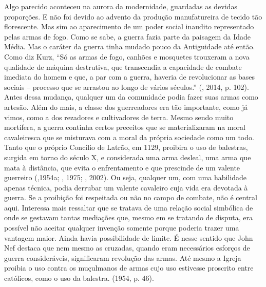 Algo parecido aconteceu na aurora da modernidade, guardadas as devidas
proporções. E não foi devido ao advento da produção manufatureira de
tecido tão florescente. Mas sim ao aparecimento de um poder social
inaudito representado pelas armas de fogo. Como se sabe, a guerra fazia
parte da paisagem da Idade Média. Mas o caráter da guerra tinha mudado
pouco da Antiguidade até então. Como diz Kurz, ``Só as armas de fogo,
canhões e mosquetes trouxeram a nova qualidade de máquina destrutiva,
que transcendia a capacidade de combate imediata do homem e que, a par
com a guerra, haveria de revolucionar as bases sociais -- processo que
se arrastou ao longo de vários séculos.'' (, 2014, p. 102). Antes
dessa mudança, qualquer um da comunidade podia fazer suas armas como
artesão. Além do mais, a classe dos guerreadores era tão importante,
como já vimos, como a dos rezadores e cultivadores de terra. Mesmo sendo
muito mortífera, a guerra continha certos preceitos que se
materializaram na moral cavaleiresca que se misturava com a moral da
própria sociedade como um todo. Tanto que o próprio Concílio de Latrão,
em 1129, proibira o uso de balestras, surgida em torno do século X, e
considerada uma arma desleal, uma arma que mata à distância, que evita o
enfrentamento e que prescinde de um valente guerreiro (,1954a;
, 1975; , 2002). Ou seja, qualquer um, com uma habilidade
apenas técnica, podia derrubar um valente cavaleiro cuja vida era
devotada à guerra. Se a proibição foi respeitada ou não no campo de
combate, não é central aqui. Interessa mais ressaltar que se tratava
de uma relação social simbólica de onde se gestavam tantas mediações
que, mesmo em se tratando de disputa, era possível não aceitar qualquer
invenção somente porque poderia trazer uma vantagem maior. Ainda havia
possibilidade de limite. É nesse sentido que John Nef destaca que nem
mesmo as cruzadas, quando eram necessários esforços de guerra
consideráveis, significaram revolução das armas. Até mesmo a Igreja
proibia o uso contra os muçulmanos de armas cujo uso estivesse proscrito
entre católicos, como o uso da balestra. (1954, p. 46).

